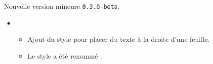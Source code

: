 Nouvelle version mineure \verb+0.3.0-beta+.

\begin{itemize}[itemsep=.5em]
    \item {}
    \begin{itemize}[itemsep=.5em]
        \item Ajout du style  pour placer du texte à la droite d'une feuille.

        \item Le style  a été renommé .
    \end{itemize}

    \separation
\end{itemize}